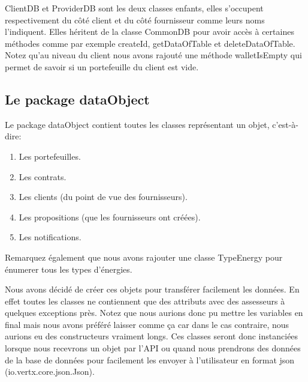 \begin{flushleft}
ClientDB et ProviderDB sont les deux classes enfants, elles s'occupent respectivement du côté client et du côté fournisseur comme leurs noms l'indiquent. Elles héritent de la classe CommonDB pour avoir accès à certaines méthodes comme par exemple createId, getDataOfTable et deleteDataOfTable. Notez qu'au niveau du client nous avons rajouté une méthode walletIsEmpty qui permet de savoir si un portefeuille du client est vide.
\end{flushleft}

\subsection{Le package dataObject}

\begin{flushleft}
Le package dataObject contient toutes les classes représentant un objet, c'est-à-dire:
\end{flushleft}

\begin{enumerate}[-]
\item Les portefeuilles.
\item Les contrats.
\item Les clients (du point de vue des fournisseurs).
\item Les propositions (que les fournisseurs ont créées).
\item Les notifications.
\end{enumerate}

\begin{flushleft}
Remarquez également que nous avons rajouter une classe TypeEnergy pour énumerer tous les types d'énergies.
\end{flushleft}

\begin{flushleft}
Nous avons décidé de créer ces objets pour transférer facilement les données. En effet toutes les classes ne contiennent que des attributs avec des assesseurs à quelques exceptions près. Notez que nous aurions donc pu mettre les variables en final mais nous avons préféré laisser comme ça car dans le cas contraire, nous aurions eu des constructeurs vraiment longs. Ces classes seront donc instanciées lorsque nous recevrons un objet par l'API ou quand nous prendrons des données de la base de données pour facilement les envoyer à l'utilisateur en format json (io.vertx.core.json.Json).
\end{flushleft}


